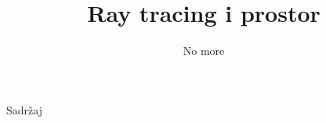 \documentclass[9pt]{beamer}
\title{Ray tracing i prostor}
\subtitle{No more}
\institute{Računalna grafika}
\begin{document}
\begin{frame}
 \titlepage
\end{frame}

\begin{frame}{Sadržaj}
  \tableofcontents
\end{frame}

%
%
\end{document}
